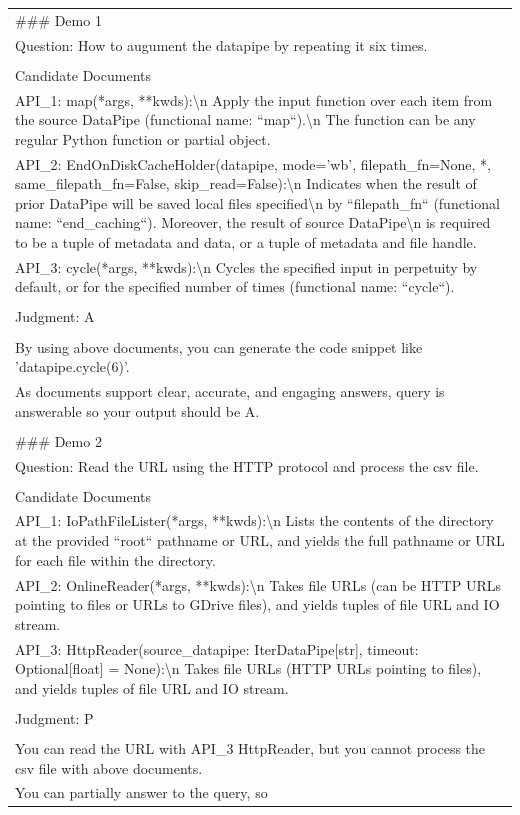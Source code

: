 \begin{table}[t!]
\small  %
\centering
\begin{tabularx}{\textwidth}{|X|}
\hline
\#\#\# Demo 1\\ Question: How to augument the datapipe by repeating it six times.\\ \\ Candidate Documents\\ API\_1: map(*args, **kwds):\textbackslash{}n    Apply the input function over each item from the source DataPipe (functional name: ``map``).\textbackslash{}n    The function can be any regular Python function or partial object.\\ API\_2: EndOnDiskCacheHolder(datapipe, mode='wb', filepath\_fn=None, *, same\_filepath\_fn=False, skip\_read=False):\textbackslash{}n    Indicates when the result of prior DataPipe will be saved local files specified\textbackslash{}n    by ``filepath\_fn`` (functional name: ``end\_caching``). Moreover, the result of source DataPipe\textbackslash{}n    is required to be a tuple of metadata and data, or a tuple of metadata and file handle.\\ API\_3: cycle(*args, **kwds):\textbackslash{}n    Cycles the specified input in perpetuity by default, or for the specified number of times (functional name: ``cycle``).\\ \\ Judgment: A\\ \\ By using above documents, you can generate the code snippet like 'datapipe.cycle(6)'.\\ As documents support clear, accurate, and engaging answers, query is answerable so your output should be A.\\ \\ \#\#\# Demo 2\\ Question: Read the URL using the HTTP protocol and process the csv file.\\ \\ Candidate Documents\\ API\_1: IoPathFileLister(*args, **kwds):\textbackslash{}n    Lists the contents of the directory at the provided ``root`` pathname or URL, and yields the full pathname or URL for each file within the directory.\\ API\_2: OnlineReader(*args, **kwds):\textbackslash{}n    Takes file URLs (can be HTTP URLs pointing to files or URLs to GDrive files), and yields tuples of file URL and IO stream.\\ API\_3: HttpReader(source\_datapipe: IterDataPipe{[}str{]}, timeout: Optional{[}float{]} = None):\textbackslash{}n    Takes file URLs (HTTP URLs pointing to files), and yields tuples of file URL and IO stream.\\ \\ Judgment: P\\ \\ You can read the URL with API\_3 HttpReader, but you cannot process the csv file with above documents.\\ You can partially answer to the query, so 
\end{tabularx}
\end{table}
